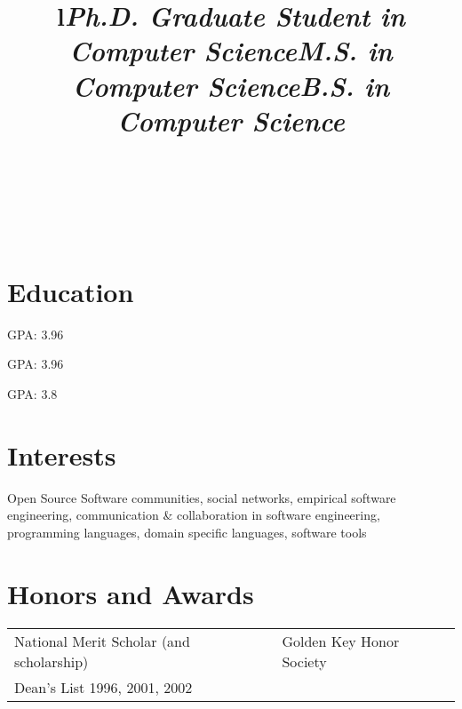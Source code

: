 \begin{resume}

\begin{format}
\title{l}\\
\\
\body\\
\end{format}

\section{\secft Education}

\title{\em Ph.D. Graduate Student in Computer Science}
\employer{}
\begin{position}
GPA: 3.96 
\end{position}

\title{\em M.S. in Computer Science}
\employer{}
\begin{position}
GPA: 3.96 
\end{position}

\title{\em B.S. in Computer Science}
\begin{position}
GPA: 3.8
\end{position}

\section{\secft Interests} Open Source Software communities, social networks, empirical software engineering, communication \& collaboration in software engineering, programming languages, domain specific languages, software tools



\section{\secft Honors and Awards}
\begin{tabular} {@{}l@{\hspace{3cm}}l}
National Merit Scholar (and scholarship) &
Golden Key Honor Society \\
Dean's List 1996, 2001, 2002 &
 

\end{tabular}
\end{resume}
